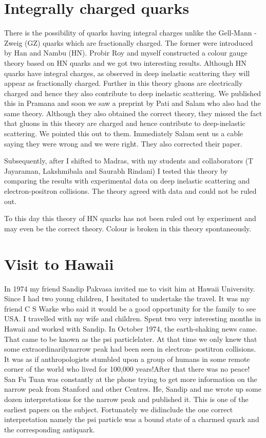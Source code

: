 \section*{Integrally charged quarks}

There is the possibility of quarks having integral charges unlike the 
Gell-Mann - Zweig (GZ) quarks which are fractionally charged. The former 
were introduced by Han and Nambu (HN). Probir Roy and myself constructed 
a colour gauge theory based on HN quarks and we got two interesting 
results. Although HN quarks have inte\-gral charges, as observed in deep 
inelastic scattering they will appear as fractionally charged. Further 
in this theory gluons are electrically charged and hence they also 
contribute to deep inelastic scattering. We published this in Pramana 
and soon we saw a preprint by Pati and Salam who also had the same 
theory. Although they also obtained the correct theory, they missed the 
fact that gluons in this theory are charged and hence contribute to 
deep-inelastic scattering. We pointed this out to them. Immedi\-ately 
Salam sent us a cable saying they were wrong and we were right. They 
also corrected their paper.

Subsequently, after I shifted to Madras, with my students and 
collaborators (T Jayaraman, Lakshmibala and Saurabh Rindani) I tested 
this theory by comparing the results with experimental data on deep 
inelastic scattering and electron-positron collisions. The theory agreed 
with data and could not be ruled out.

To this day this theory of HN quarks has not been ruled out by 
experiment and may even be the correct theory. Colour is broken in this 
theory spontaneously.
\newpage

\section*{Visit to Hawaii}

In 1974 my friend Sandip Pakvasa invited me to visit him at Hawaii 
University. Since I had two young children, I hesitated to undertake the 
travel. It was my friend C S Warke who said it would be a good 
opportunity for the family to see USA. I travelled with my wife and 
children. Spent two very interesting months in Hawaii and worked with 
Sandip. In October 1974, the earth-shaking news came. That came to be 
known as the psi particle\break later. At that time we only knew that some 
extraordinarily\break narrow peak had been seen in electron- postitron 
collisions. It was as if anthropologists stumbled upon a group of humans 
in some remote corner of the world who lived for 100,000 years!\break After 
that there was no peace! San Fu Tuan was constantly at the phone trying 
to get more information on the narrow peak from Stanford and other 
Centres. He, Sandip and me wrote up some dozen interpretations for the 
narrow peak and published it. This is one of the earliest papers on the 
subject. Fortunately we did\break include the one correct interpretation 
namely the psi particle was a bound state of a charmed quark and the 
corresponding antiquark.

